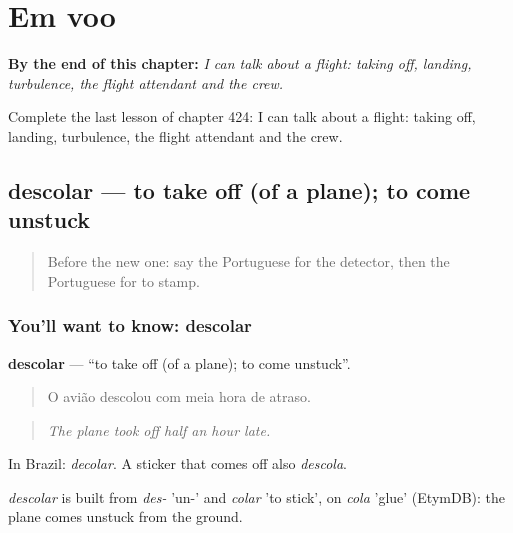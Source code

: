 
\chapter{Em voo}
\label{ch:pt-em-voo}

\begin{chapteropening}
\textbf{By the end of this chapter:} \emph{I can talk about a flight: taking off, landing, turbulence, the flight attendant and the crew.}

Complete the last lesson of chapter 424: I can talk about a flight: taking off, landing, turbulence, the flight attendant and the crew.
\end{chapteropening}

\section[descolar]{descolar — to take off (of a plane); to come unstuck}

\label{lesson:PT-C424-descolar}



\begin{quote}
Before the new one: say the Portuguese for the detector, then the Portuguese for to stamp.
\end{quote}

\subsection*{You'll want to know: descolar}
\textbf{descolar} — \textquotedblleft{}to take off (of a plane); to come unstuck\textquotedblright{}.

\begin{quote}
O avião descolou com meia hora de atraso.
\end{quote}

\begin{quote}
\emph{The plane took off half an hour late.}
\end{quote}

In Brazil: \emph{decolar}. A sticker that comes off also \emph{descola}.

\begin{cousinweb}
\emph{descolar} is built from \emph{des-} 'un-' and \emph{colar} 'to stick', on \emph{cola} 'glue' (EtymDB): the plane comes unstuck from the ground.
\end{cousinweb}

